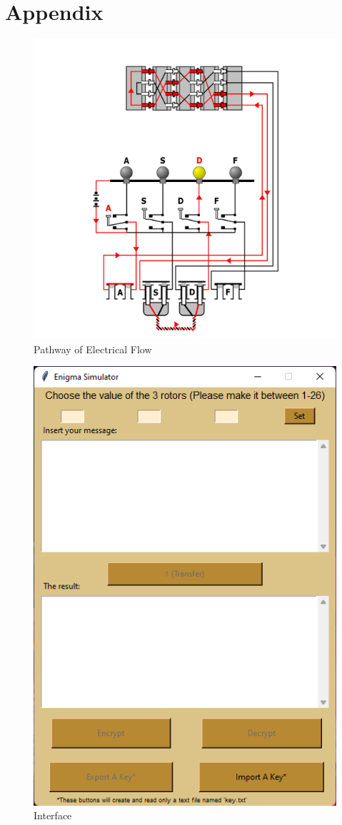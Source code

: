 \documentclass[conference,compsoc]{IEEEtran}
\begin{document}
\section{Appendix}
\begin{figure}[h!]
    \centering
    \includegraphics[scale = .7]{pathway.png}
    \caption{Pathway of Electrical Flow}
    \label{fig:path}
\end{figure}
\begin{figure}[h!]
    \centering
    \includegraphics[scale = .9]{interface.png}
    \caption{Interface}
    \label{fig:infac}
\end{figure}
\end{document}
